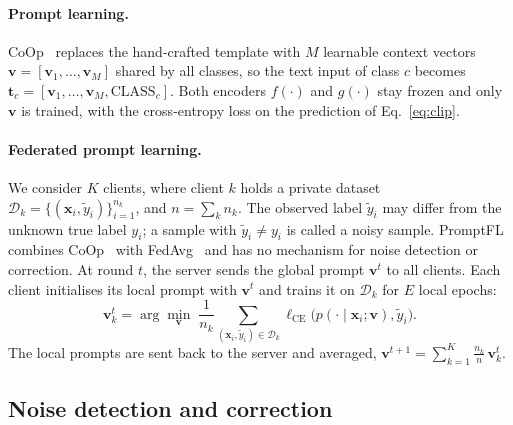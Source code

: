 \documentclass[runningheads]{llncs}
\begin{document}
\paragraph{Prompt learning.}
CoOp~\cite{zhou2022learning} replaces the hand-crafted template with $M$ learnable context vectors
$\mathbf{v} = [\mathbf{v}_1, \dots, \mathbf{v}_M]$ shared by all classes, so the text input of
class $c$ becomes $\mathbf{t}_c = [\mathbf{v}_1, \dots, \mathbf{v}_M, \mathrm{CLASS}_c]$.
Both encoders $f(\cdot)$ and $g(\cdot)$ stay frozen and only $\mathbf{v}$ is trained, with the
cross-entropy loss on the prediction of Eq.~\eqref{eq:clip}.

\paragraph{Federated prompt learning.}
We consider $K$ clients, where client $k$ holds a private dataset
$\mathcal{D}_k = \{(\mathbf{x}_i, \tilde{y}_i)\}_{i=1}^{n_k}$, and $n = \sum_k n_k$.
The observed label $\tilde{y}_i$ may differ from the unknown true label $y_i$; a sample with
$\tilde{y}_i \neq y_i$ is called a noisy sample. PromptFL~\cite{guo2023promptfl} combines
CoOp~\cite{zhou2022learning} with FedAvg~\cite{mcmahan2017communication} and has no mechanism for
noise detection or correction. At round $t$, the server sends the global prompt $\mathbf{v}^{t}$ to
all clients. Each client initialises its local prompt with $\mathbf{v}^{t}$ and trains it on
$\mathcal{D}_k$ for $E$ local epochs:
\begin{equation}
\mathbf{v}^{t}_k = \arg\min_{\mathbf{v}} \;
\frac{1}{n_k} \sum_{(\mathbf{x}_i, \tilde{y}_i) \in \mathcal{D}_k}
\ell_{\mathrm{CE}}\big(p(\cdot \mid \mathbf{x}_i; \mathbf{v}), \tilde{y}_i\big).
\label{eq:local}
\end{equation}
The local prompts are sent back to the server and averaged,
$\mathbf{v}^{t+1} = \sum_{k=1}^{K} \frac{n_k}{n}\, \mathbf{v}^{t}_k$.

% 


\subsection{Noise detection and correction}
\label{sec:detect}
\end{document}
